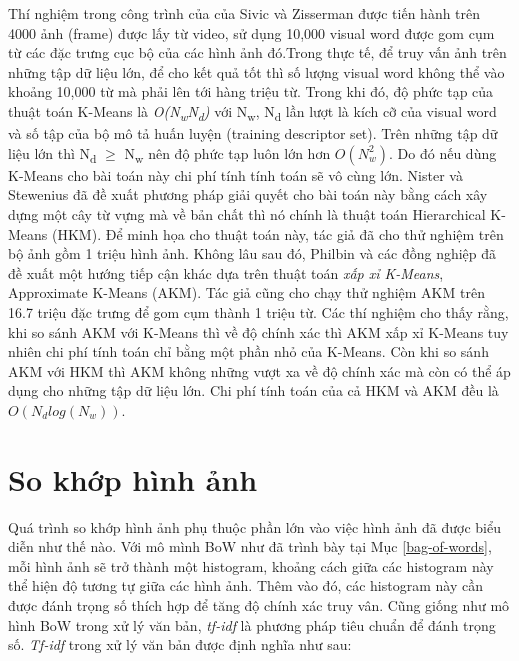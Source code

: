 Thí nghiệm trong công trình của của Sivic và Zisserman \cite{sivic2003video} được tiến hành trên 4000 ảnh (frame) được lấy từ video, sử dụng 10,000 visual word được gom cụm từ các đặc trưng cục bộ của các hình ảnh đó.Trong thực tế, để truy vấn ảnh trên những tập dữ liệu lớn, để cho kết quả tốt thì số lượng visual word không thể vào khoảng 10,000 từ mà phải lên tới hàng triệu từ\cite{philbin2007object}. Trong khi đó, độ phức tạp của thuật toán K-Means là \textit{O(N\textsubscript{w}N\textsubscript{d})} với N\textsubscript{w}, N\textsubscript{d} lần lượt là kích cỡ của visual word và số tập của bộ mô tả huấn luyện (training descriptor set). Trên những tập dữ liệu lớn thì N\textsubscript{d} $\geq$ N\textsubscript{w} nên độ phức tạp luôn lớn hơn $O(N^2_w)$. Do đó nếu dùng K-Means cho bài toán này chi phí tính tính toán sẽ vô cùng lớn. Nister và Stewenius \cite{nister2006scalable} đã đề xuất phương pháp giải quyết cho bài toán này bằng cách xây dựng một cây từ vựng mà về bản chất thì nó chính là thuật toán Hierarchical K-Means (HKM). Để minh họa cho thuật toán này, tác giả đã cho thử nghiệm trên bộ ảnh gồm 1 triệu hình ảnh. Không lâu sau đó, Philbin và các đồng nghiệp \cite{philbin2007object} đã đề xuất một hướng tiếp cận khác dựa trên thuật toán \textit{xấp xỉ K-Means}, Approximate K-Means (AKM). Tác giả cũng cho chạy thử nghiệm AKM trên 16.7 triệu đặc trưng để gom cụm thành 1 triệu từ. Các thí nghiệm cho thấy rằng, khi so sánh AKM với K-Means thì về độ chính xác thì AKM xấp xỉ K-Means tuy nhiên chi phí tính toán chỉ bằng một phần nhỏ của K-Means. Còn khi so sánh AKM với HKM thì AKM không những vượt xa về độ chính xác mà còn có thể áp dụng cho những tập dữ liệu lớn. Chi phí tính toán của cả HKM và AKM đều là $O(N_d log(N_w))$.

\section{So khớp hình ảnh}
\label{matching}
Quá trình so khớp hình ảnh phụ thuộc phần lớn vào việc hình ảnh đã được biểu diễn như thế nào. Với mô mình BoW như đã trình bày tại Mục \ref{bag-of-words}, mỗi hình ảnh sẽ trở thành một histogram, khoảng cách giữa các histogram này thể hiện độ tương tự giữa các hình ảnh. Thêm vào đó, các histogram này cần được đánh trọng số thích hợp để tăng độ chính xác truy vân. Cũng giống như mô hình BoW trong xử lý văn bản, \textit{tf-idf}\cite{manning2008introduction} là phương pháp tiêu chuẩn để đánh trọng số. \textit{Tf-idf} trong xử lý văn bản được định nghĩa như sau:

